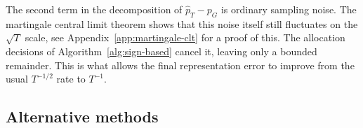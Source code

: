 \documentclass[twoside]{article}
\newtheorem{example}{Example}
\begin{document}
The second term in the decomposition of $\widehat p_T-p_G$ is ordinary sampling noise. The
martingale central limit theorem shows that this noise itself still fluctuates
on the \(\sqrt T\) scale, see Appendix~\ref{app:martingale-clt} for a proof of this. The allocation decisions of Algorithm~\ref{alg:sign-based} cancel it, leaving only a bounded
remainder. This is what allows the final representation error to improve from
the usual \(T^{-1/2}\) rate to \(T^{-1}\).

\subsection{Alternative methods}


\end{document}
